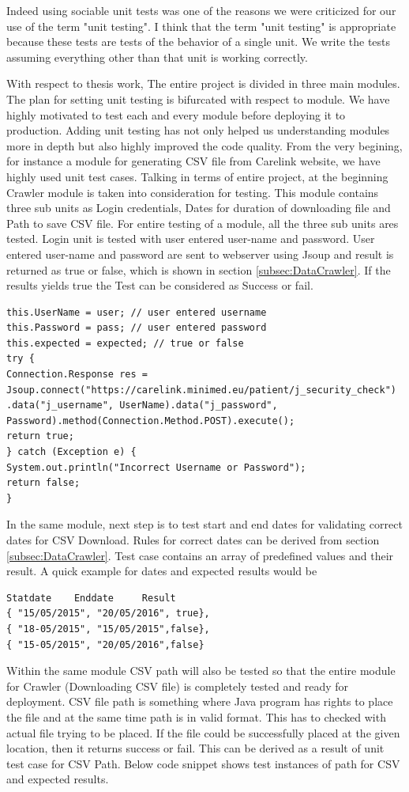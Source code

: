 \documentclass[article,type=msc,colorback,accentcolor=tud9c,twoside,11pt]{tudthesis}
\begin{document}
Indeed using sociable unit tests was one of the reasons we were criticized for our use of the term "unit testing". I think that the term "unit testing" is appropriate because these tests are tests of the behavior of a single unit. We write the tests assuming everything other than that unit is working correctly.

With respect to thesis work, The entire project is divided in three main modules. The plan for setting unit testing is bifurcated with respect to module. We have highly motivated to test each and every module before deploying it to production. Adding unit testing has not only helped us understanding modules more in depth but also highly improved the code quality. From the very begining, for instance a module for generating CSV file from Carelink website, we have highly used unit test cases. Talking in terms of entire project, at the beginning Crawler module is taken into consideration for testing. This module contains three sub units as Login credentials, Dates for duration of downloading file and Path to save CSV file. For entire testing of a module, all the three sub units ares tested. Login unit is tested with user entered user-name and password. User entered user-name and password are sent to webserver using Jsoup and result is returned as true or false, which is shown in section \ref{subsec:DataCrawler}. If the results yields  true the Test can be considered as Success or fail.
\begin{lstlisting}
this.UserName = user; // user entered username
this.Password = pass; // user entered password
this.expected = expected; // true or false
try {
Connection.Response res = Jsoup.connect("https://carelink.minimed.eu/patient/j_security_check")
.data("j_username", UserName).data("j_password", Password).method(Connection.Method.POST).execute();
return true;
} catch (Exception e) {
System.out.println("Incorrect Username or Password");
return false;
}
\end{lstlisting}
 In the same module, next step is to test start and end dates for validating correct dates for CSV Download. Rules for correct dates can be derived from section \ref{subsec:DataCrawler}. Test case contains an array of predefined values and their result. A quick example for dates and expected results would be
\begin{lstlisting}
Statdate 	Enddate 	Result
{ "15/05/2015", "20/05/2016", true},
{ "18-05/2015", "15/05/2015",false},
{ "15-05/2015", "20/05/2016",false}
\end{lstlisting}
 Within the same module CSV path will also be tested so that the entire module for Crawler (Downloading CSV file) is completely tested and ready for deployment. CSV file path is something where Java program has rights to place the file and at the same time path is in valid format. This has to checked with actual file trying to be placed. If the file could be successfully placed at the given location, then it returns success or fail. This can be derived as a result of unit test case for CSV Path. Below code snippet shows test instances of path for CSV and expected results.
\end{document}
